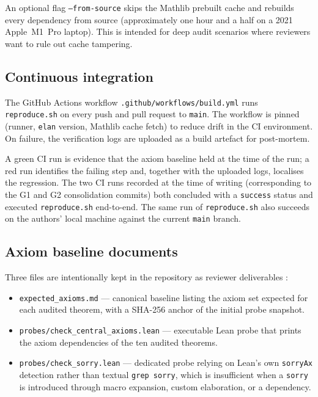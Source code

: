 An optional flag \texttt{--from-source} skips the Mathlib prebuilt cache
and rebuilds every dependency from source (approximately one hour and a
half on a 2021 Apple~M1~Pro laptop). This is intended for deep audit
scenarios where reviewers want to rule out cache tampering.

\subsection{Continuous integration}

The GitHub Actions workflow \texttt{.github/workflows/build.yml} runs
\texttt{reproduce.sh} on every push and pull request to \texttt{main}.
The workflow is pinned (runner, \texttt{elan} version, Mathlib cache
fetch) to reduce drift in the CI environment. On failure, the verification
logs are uploaded as a build artefact for post-mortem.

A green CI run is evidence that the axiom baseline held at the time of
the run; a red run identifies the failing step and, together with the
uploaded logs, localises the regression. The two CI runs recorded at the
time of writing (corresponding to the G1 and G2 consolidation commits)
both concluded with a \texttt{success} status and executed
\texttt{reproduce.sh} end-to-end. The same run of \texttt{reproduce.sh}
also succeeds on the authors' local machine against the current
\texttt{main} branch.

\subsection{Axiom baseline documents}

Three files are intentionally kept in the repository as reviewer
deliverables :

\begin{itemize}
  \item \texttt{expected\_axioms.md} --- canonical baseline listing the
        axiom set expected for each audited theorem, with a SHA-256
        anchor of the initial probe snapshot.
  \item \texttt{probes/check\_central\_axioms.lean} --- executable Lean
        probe that prints the axiom dependencies of the ten audited
        theorems.
  \item \texttt{probes/check\_sorry.lean} --- dedicated probe relying on
        Lean's own \texttt{sorryAx} detection rather than textual
        \texttt{grep sorry}, which is insufficient when a \texttt{sorry}
        is introduced through macro expansion, custom elaboration, or a
        dependency.
\end{itemize}

